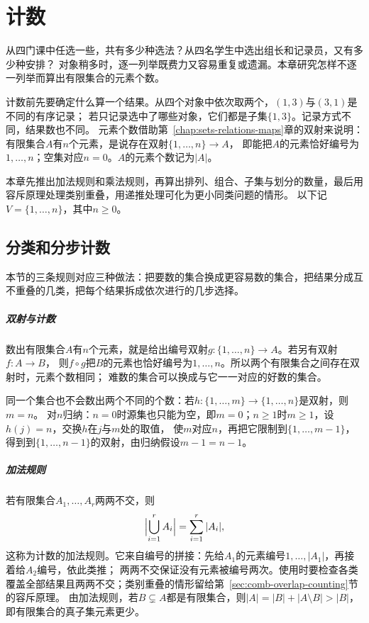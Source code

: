 \chapter{计数}
\label{chap:combinatorics}
\label{chap:counting}

从四门课中任选一些，共有多少种选法？从四名学生中选出组长和记录员，又有多少种安排？
对象稍多时，逐一列举既费力又容易重复或遗漏。本章研究怎样不逐一列举而算出有限集合的元素个数。

计数前先要确定什么算一个结果。从四个对象中依次取两个，$(1,3)$与$(3,1)$是不同的有序记录；
若只记录选中了哪些对象，它们都是子集$\{1,3\}$。记录方式不同，结果数也不同。
元素个数借助第~\ref{chap:sets-relations-maps}章的双射来说明：有限集合$A$有$n$个元素，是说存在双射$\{1,\ldots,n\}\to A$，
即能把$A$的元素恰好编号为$1,\ldots,n$；空集对应$n=0$。$A$的元素个数记为$|A|$。

本章先推出加法规则和乘法规则，再算出排列、组合、子集与划分的数量，最后用容斥原理处理类别重叠，用递推处理可化为更小同类问题的情形。
以下记$V=\{1,\ldots,n\}$，其中$n\geq0$。

\section{分类和分步计数}
\label{sec:comb-families-counting}
\label{sec:comb-finite-counting}
\label{sec:comb-decomposition-counting}
\label{sec:comb-classification-products}
\label{sec:comb-classification-counting}

本节的三条规则对应三种做法：把要数的集合换成更容易数的集合，把结果分成互不重叠的几类，把每个结果拆成依次进行的几步选择。

\paragraph{双射与计数}
数出有限集合$A$有$n$个元素，就是给出编号双射$g:\{1,\ldots,n\}\to A$。若另有双射$f:A\to B$，
则$f\circ g$把$B$的元素也恰好编号为$1,\ldots,n$。所以两个有限集合之间存在双射时，元素个数相同；
难数的集合可以换成与它一一对应的好数的集合。

同一个集合也不会数出两个不同的个数：若$h:\{1,\ldots,m\}\to\{1,\ldots,n\}$是双射，则$m=n$。
对$n$归纳：$n=0$时源集也只能为空，即$m=0$；$n\geq1$时$m\geq1$，设$h(j)=n$，交换$h$在$j$与$m$处的取值，
使$m$对应$n$，再把它限制到$\{1,\ldots,m-1\}$，得到到$\{1,\ldots,n-1\}$的双射，由归纳假设$m-1=n-1$。

\paragraph{加法规则}
若有限集合$A_1,\ldots,A_r$两两不交，则
\[
 \Bigl|\bigcup_{i=1}^r A_i\Bigr|=\sum_{i=1}^r|A_i|,
\]
这称为计数的加法规则。它来自编号的拼接：先给$A_1$的元素编号$1,\ldots,|A_1|$，再接着给$A_2$编号，依此类推；
两两不交保证没有元素被编号两次。使用时要检查各类覆盖全部结果且两两不交；类别重叠的情形留给第~\ref{sec:comb-overlap-counting}节的容斥原理。
由加法规则，若$B\subsetneq A$都是有限集合，则$|A|=|B|+|A\setminus B|>|B|$，即有限集合的真子集元素更少。

